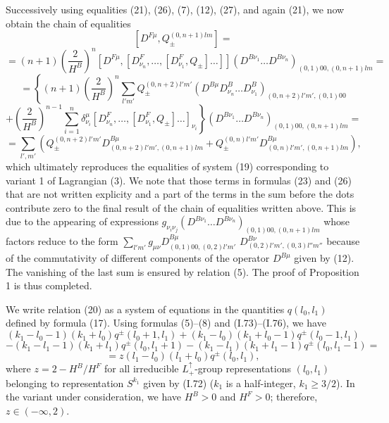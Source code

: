 \documentclass[a4paper,12pt]{article}
\begin{document}
Successively using equalities (21), (26), (7), (12), (27), and again (21), we
now obtain the chain of equalities
$$[D^{F \mu}, Q^{(0,n+1)lm}_{\pm}] =$$
$$= (n+1) \left( \frac{2}{H^{B}} \right)^{n}
[D^{F \mu},[D^{F}_{\nu_{n}}, \ldots, [D^{F}_{\nu_{1}},Q_{\pm}]\ldots ]]\left( 
D^{B\nu_{1}}\ldots D^{B\nu_{n}} \right)_{(0,1)00,(0,n+1)lm} =$$
$$= \left\{ (n+1)\left( \frac{2}{H^{B}} \right)^{n} \sum_{l'm'} 
Q^{(0,n+2)l'm'}_{\pm} \left( D^{B \mu} D^{B}_{\nu_{n}} \ldots  D^{B}_{\nu_{1}}
\right)_{(0,n+2)l'm',(0,1)00} \right.$$
$$+ \left. \left( \frac{2}{H^{B}} \right)^{n-1}
\sum_{i=1}^{n} \delta^{\mu}_{\nu_{i}}
[D^{F}_{\nu_{n}}, \ldots, [ D^{F}_{\nu_{1}},Q_{\pm}]\ldots ]_{\nu_{i}}\right\}
\left( D^{B\nu_{1}}\ldots D^{B\nu_{n}} \right)_{(0,1)00,(0,n+1)lm} =$$
$$= \sum_{l',m'} \left( Q^{(0,n+2)l'm'}_{\pm} D^{B \mu}_{(0,n+2)l'm',(0,n+1)lm}
+ Q^{(0,n)l'm'}_{\pm} D^{B \mu}_{(0,n)l'm',(0,n+1)lm} \right),$$
which ultimately reproduces the equalities of system (19) corresponding to
variant 1 of Lagrangian (3). We note that those terms in formulas (23) and (26)
that are not written explicity and a part of the terms in the sum before the
dots contribute zero to the final result of the chain of equalities written
above. This is due to the appearing of expressions $g_{\nu_{i}\nu_{j}}
(D^{B\nu_{1}} \ldots D^{B\nu_{n}})_{(0,1)00,(0,n+1)lm}$ whose factors reduce to
the form $\sum_{l'm'} g_{\mu\nu}D^{B\mu}_{(0,1)00,(0,2)l'm'}$ 
$D^{B\nu}_{(0,2)l'm',(0,3)l''m''}$ because of the commutativity of 
different components of the operator $D^{B\mu}$ given by (12). The vanishing of
the last sum is ensured by relation (5). The proof of Proposition 1 is thus 
completed.

We write relation (20) as a system of equations in the quantities 
$q(l_{0},l_{1})$ defined by formula (17). Using formulas (5)--(8) and
(I.73)--(I.76), we have
$$(k_{1}-l_{0}-1)(k_{1}+l_{0})q^{\pm}(l_{0}+1,l_{1})
+ (k_{1}-l_{0})(k_{1}+l_{0}-1)q^{\pm}(l_{0}-1,l_{1})$$
$$- (k_{1}-l_{1}-1)(k_{1}+l_{1})q^{\pm}(l_{0},l_{1}+1)
- (k_{1}-l_{1})(k_{1}+l_{1}-1)q^{\pm}(l_{0},l_{1}-1) =$$
\begin{equation}
= z(l_{1}-l_{0})(l_{1}+l_{0})q^{\pm}(l_{0},l_{1}),
\end{equation}
where $z = 2-H^{B}/H^{F}$ for all irreducible $L^{\uparrow}_{+}$-group 
representations $(l_{0},l_{1})$ belonging to representation $S^{k_{1}}$ given 
by (I.72) ($k_{1}$ is a half-integer, $k_{1} \geq 3/2$). In the variant under
consideration, we have $H^{B} > 0$ and $H^{F} > 0$; therefore, 
$z \in (-\infty, 2)$.
\end{document}
